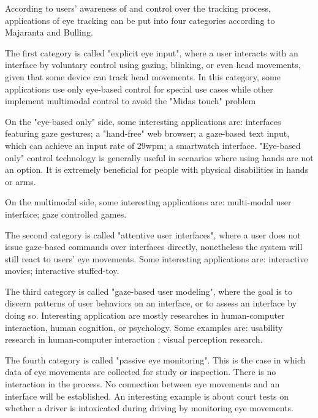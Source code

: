 \documentclass[english]{tktltiki}
\begin{document}
According to users' awareness of and control over the tracking process, applications of eye tracking can be put into four categories according to Majaranta and Bulling.\cite{majaranta14}

The first category is called "explicit eye input", where a user interacts with an interface by voluntary control using gazing, blinking, or even head movements, given that some device can track head movements. In this category, some applications use only eye-based control for special use cases while other implement multimodal control to avoid the "Midas touch" problem \cite{Velichkovsky97}

On the "eye-based only" side, some interesting applications are: interfaces featuring gaze gestures\cite{Drewes:2007:ICU:1778331.1778385}\cite{Ohno:1998:FEG:786112.786297}; a "hand-free" web browser\cite{5090980}; a gaze-based text input\cite{wardmackay2002}, which can achieve an input rate of 29wpm; a smartwatch interface\cite{Hansen:2015:GIT:2800835.2804332}. "Eye-based only" control technology is generally useful in scenarios where using hands are not an option. It is extremely beneficial for people with physical disabilities in hands or arms. 

On the multimodal side, some interesting applications are: multi-modal user interface\cite{538404}\cite{maglio2000}; gaze controlled games\cite{Isokoski:2009:GCG:1667488.1667491}. 

The second category is called "attentive user interfaces", where a user does not issue gaze-based commands over interfaces directly, nonetheless the system will still react to users' eye movements. Some interesting applications are: interactive movies\cite{doi:10.1080/14626260500476523}; interactive stuffed-toy\cite{Yonezawa:2007:GBS:1322192.1322218}.

The third category is called "gaze-based user modeling", where the goal is to discern patterns of user behaviors on an interface, or to assess an interface by doing so. Interesting application are mostly researches in human-computer interaction, human cognition, or psychology. Some examples are: usability research in human-computer interaction \cite{Poole05eyetracking} \cite{Jacob2003573}; visual perception research\cite{John2004}.

The fourth category is called "passive eye monitoring". This is the case in which data of eye movements are collected for study or inspection. There is no interaction in the process. No connection between eye movements and an interface will be established. An interesting example is about court tests on whether a driver is intoxicated during driving by monitoring eye movements\cite{Busloff1993}.
\end{document}
